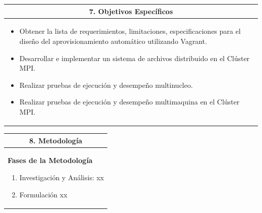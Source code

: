 \documentclass[letter,12pt]{article}
\begin{document}

\begin{center}
\begin{tabular}{|p{15.5cm}|}
\hline
\multicolumn{1}{|c|}{ \textbf{7. Objetivos Específicos}}\\
\hline
\begin{itemize}
	\item Obtener la lista de requerimientos, limitaciones, especificaciones para el diseño del aprovisionamiento automático utilizando Vagrant.
	\item Desarrollar e implementar un sistema de archivos distribuido en el Clúster MPI.
    \item Realizar pruebas de ejecución y desempeño multinucleo.
    \item Realizar pruebas de ejecución y desempeño multimaquina en el Clúster MPI.
\end{itemize} \\
\hline
\end{tabular}
\end{center}


\begin{center}
\begin{tabular}{|p{15.5cm}|}
\hline
\multicolumn{1}{|c|}{ \textbf{8. Metodología} }\\
\hline
\textbf{Fases de la Metodología}
    \begin{enumerate}
        \item Investigación y Análisis:
        xx
        \item Formulación
		xx
        \end{enumerate}\\
        
\hline
\end{tabular}
\end{center}
\end{document}
